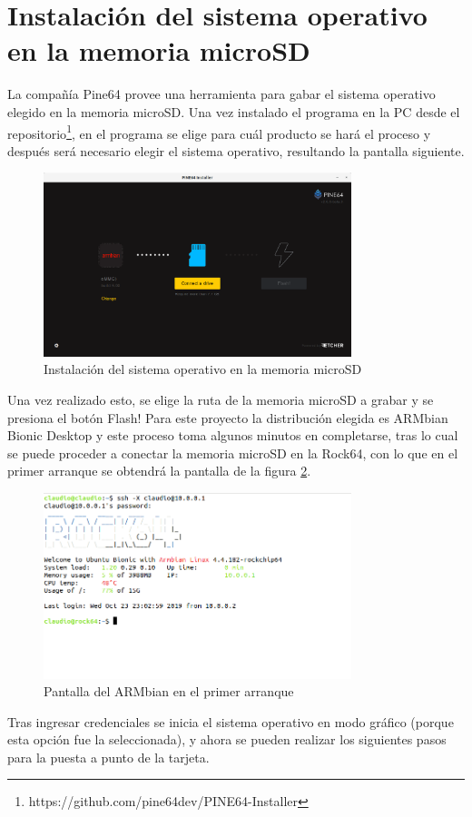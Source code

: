 \documentclass[12pt, letterpaper, oneside]{book}
\begin{document}
	\section{Instalación del sistema operativo en la memoria microSD}
	La compañía Pine64 provee una herramienta para gabar el sistema operativo elegido en la memoria microSD. Una vez instalado el programa en la PC desde el repositorio\footnote{https://github.com/pine64dev/PINE64-Installer}, en el programa se elige para cuál producto se hará el proceso y después será necesario elegir el sistema operativo, resultando la pantalla siguiente. 
	\begin{figure}[htbp!]
		\centering
		\includegraphics[width=0.8\textwidth]{./Figuras/Etcher}
		\caption{Instalación del sistema operativo en la memoria microSD}
		\label{fig:etcher}
	\end{figure}
	\par Una vez realizado esto, se elige la ruta de la memoria microSD a grabar y se presiona el botón Flash! Para este proyecto la distribución elegida es ARMbian Bionic Desktop y este proceso toma algunos minutos en completarse, tras lo cual se puede proceder a conectar la memoria microSD en la Rock64, con lo que en el primer arranque se obtendrá la pantalla de la figura \ref{fig:ARMbian}.
	\begin{figure}[htbp!]
		\centering
		\includegraphics[width=0.8\textwidth]{./Figuras/Boot}
		\caption{Pantalla del ARMbian en el primer arranque}
		\label{fig:ARMbian}
	\end{figure}
	\par Tras ingresar credenciales se inicia el sistema operativo en modo gráfico (porque esta opción fue la seleccionada), y ahora se pueden realizar los siguientes pasos para la puesta a punto de la tarjeta.
\end{document}
